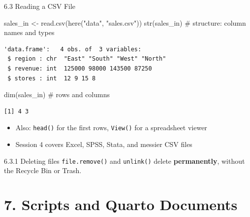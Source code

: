 \documentclass[
  ignorenonframetext,
  aspectratio=169,
]{beamer}
\newenvironment{Shaded}{\begin{snugshade}}{\end{snugshade}}
\newcommand{\CommentTok}[1]{\textcolor[rgb]{0.37,0.37,0.37}{#1}}
\newcommand{\FunctionTok}[1]{\textcolor[rgb]{0.28,0.35,0.67}{#1}}
\newcommand{\NormalTok}[1]{\textcolor[rgb]{0.00,0.23,0.31}{#1}}
\newcommand{\OtherTok}[1]{\textcolor[rgb]{0.00,0.23,0.31}{#1}}
\newcommand{\StringTok}[1]{\textcolor[rgb]{0.13,0.47,0.30}{#1}}
\providecommand{\tightlist}{%
  \setlength{\itemsep}{0pt}\setlength{\parskip}{0pt}}
\begin{document}
\begin{frame}[fragile]{6.3 Reading a CSV File}
\protect{}\label{reading-a-csv-file}
\begin{Shaded}
\begin{Highlighting}[]
\NormalTok{sales\_in }\OtherTok{\textless{}{-}} \FunctionTok{read.csv}\NormalTok{(}\FunctionTok{here}\NormalTok{(}\StringTok{"data"}\NormalTok{, }\StringTok{"sales.csv"}\NormalTok{))}
\FunctionTok{str}\NormalTok{(sales\_in)        }\CommentTok{\# structure: column names and types}
\end{Highlighting}
\end{Shaded}

\begingroup\tiny\color{darkgray}

\begin{verbatim}
'data.frame':   4 obs. of  3 variables:
 $ region : chr  "East" "South" "West" "North"
 $ revenue: int  125000 98000 143500 87250
 $ stores : int  12 9 15 8
\end{verbatim}

\endgroup

\begin{Shaded}
\begin{Highlighting}[]
\FunctionTok{dim}\NormalTok{(sales\_in)        }\CommentTok{\# rows and columns}
\end{Highlighting}
\end{Shaded}

\begingroup\tiny\color{darkgray}

\begin{verbatim}
[1] 4 3
\end{verbatim}

\endgroup

\begin{itemize}
\tightlist
\item
  Also: \texttt{head()} for the first rows, \texttt{View()} for a
  spreadsheet viewer
\item
  Session 4 covers Excel, SPSS, Stata, and messier CSV files
\end{itemize}

\begin{alertblock}{6.3.1 Deleting files}
\protect{}\label{deleting-files}
\texttt{file.remove()} and \texttt{unlink()} delete
\textbf{permanently}, without the Recycle Bin or Trash.
\end{alertblock}
\end{frame}

\section{7. Scripts and Quarto Documents}\label{sec-quarto}
\end{document}
